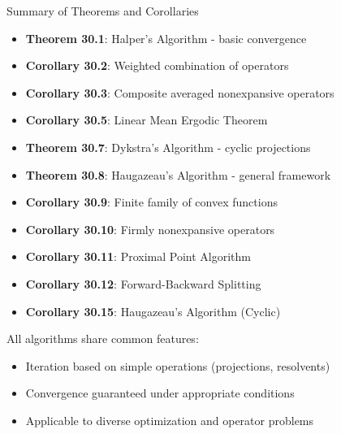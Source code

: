 \documentclass[aspectratio=169,10pt]{beamer}
\begin{document}
\begin{frame}[allowframebreaks]{Summary of Theorems and Corollaries}
  \begin{itemize}
    \item \textbf{Theorem 30.1}: Halper's Algorithm - basic convergence
    \item \textbf{Corollary 30.2}: Weighted combination of operators
    \item \textbf{Corollary 30.3}: Composite averaged nonexpansive operators
    \item \textbf{Corollary 30.5}: Linear Mean Ergodic Theorem
    \item \textbf{Theorem 30.7}: Dykstra's Algorithm - cyclic projections
    \item \textbf{Theorem 30.8}: Haugazeau's Algorithm - general framework
    \item \textbf{Corollary 30.9}: Finite family of convex functions
    \item \textbf{Corollary 30.10}: Firmly nonexpansive operators
    \item \textbf{Corollary 30.11}: Proximal Point Algorithm
    \item \textbf{Corollary 30.12}: Forward-Backward Splitting
    \item \textbf{Corollary 30.15}: Haugazeau's Algorithm (Cyclic)
  \end{itemize}

  \vspace{0.3cm}

  All algorithms share common features:
  \begin{itemize}
    \item Iteration based on simple operations (projections, resolvents)
    \item Convergence guaranteed under appropriate conditions
    \item Applicable to diverse optimization and operator problems
  \end{itemize}
\end{frame}

\end{document}
